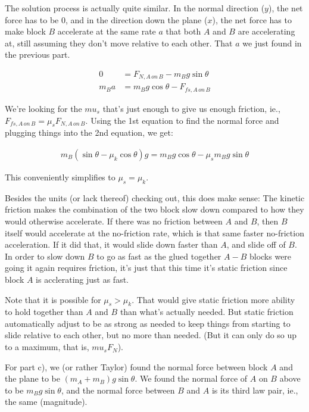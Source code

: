 \documentclass[12pt]{article}
\begin{document}
\begin{enumerate}
{The solution process is actually quite similar. In the normal direction ($y$), the net force has to be 0, and in the direction down the plane ($x$), the net force has to make block $B$ accelerate at the same rate $a$ that both $A$ and $B$ are accelerating at, still assuming they don't move relative to each other. That $a$ we just found in the previous part.

\begin{align}
  0 &= F_{N,A \,on\,B} - m_B g \sin\theta\\
  m_B a &= m_B g \cos\theta - F_{fs, A \,on\, B}
\end{align}

We're looking for the $mu_s$ that's just enough to give us enough friction, ie., $F_{fs, A\,on\,B} = \mu_s F_{N, A\,on\,B}$. Using the 1st equation to find the normal force and plugging things into the 2nd equation, we get:

\begin{align}
m_B (\sin\theta - \mu_k\cos\theta) g = m_B g \cos \theta - \mu_s m_B g \sin\theta
\end{align}

This conveniently simplifies to $\mu_s = \mu_k$.

Besides the units (or lack thereof) checking out, this does make sense: The kinetic friction makes the combination of the two block slow down compared to how they would otherwise accelerate. If there was no friction between $A$ and $B$, then $B$ itself would accelerate at the no-friction rate, which is that same faster no-friction acceleration. If it did that, it would slide down faster than $A$, and slide off of $B$. In order to slow down $B$ to go as fast as the glued together $A-B$ blocks were going it again requires friction, it's just that this time it's static friction since block $A$ is acclerating just as fast.

Note that it is possible for $\mu_s > \mu_k$. That would give static friction more ability to hold together than $A$ and $B$ than what's actually needed. But static friction automatically adjust to be as strong as needed to keep things from starting to slide relative to each other, but no more than needed. (But it can only do so up to a maximum, that is, $mu_s F_N$).

For part c), we (or rather Taylor) found the normal force between block $A$ and the plane to be $(m_A + m_B) g \sin\theta$.
We found the normal force of $A$ on $B$ above to be $m_B g \sin\theta$, and the normal force between $B$ and $A$ is its third law pair, ie., the same (magnitude).

}
\end{enumerate}
\end{document}
